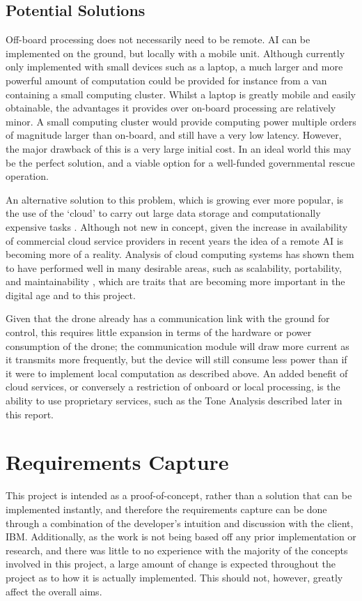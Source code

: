 \documentclass{article}
\begin{document}
\subsection{Potential Solutions}\label{PotentialSolutions}
Off-board processing does not necessarily need to be remote. AI can be implemented on the ground, but locally with a mobile unit. Although currently only implemented with small devices such as a laptop, a much larger and more powerful amount of computation could be provided for instance from a van containing a small computing cluster. Whilst a laptop is greatly mobile and easily obtainable, the advantages it provides over on-board processing are relatively minor. A small computing cluster would provide computing power multiple orders of magnitude larger than on-board, and still have a very low latency. However, the major drawback of this is a very large initial cost. In an ideal world this may be the perfect solution, and a viable option for a well-funded governmental rescue operation.

An alternative solution to this problem, which is growing ever more popular, is the use of the `cloud' to carry out large data storage and computationally expensive tasks \cite{CloudRobotics}. Although not new in concept, given the increase in availability of commercial cloud service providers in recent years the idea of a remote AI is becoming more of a reality. Analysis of cloud computing systems has shown them to have performed well in many desirable areas, such as scalability, portability, and maintainability \cite{SoftwareArchitecture}, which are traits that are becoming more important in the digital age and to this project. 

Given that the drone already has a communication link with the ground for control, this requires little expansion in terms of the hardware or power consumption of the drone; the communication module will draw more current as it transmits more frequently, but the device will still consume less power than if it were to implement local computation as described above. An added benefit of cloud services, or conversely a restriction of onboard or local processing, is the ability to use proprietary services, such as the Tone Analysis described later in this report.


\section{Requirements Capture}
This project is intended as a proof-of-concept, rather than a solution that can be implemented instantly, and therefore the requirements capture can be done through a combination of the developer's intuition and discussion with the client, IBM. Additionally, as the work is not being based off any prior implementation or research, and there was little to no experience with the majority of the concepts involved in this project, a large amount of change is expected throughout the project as to how it is actually implemented. This should not, however, greatly affect the overall aims.
\end{document}
